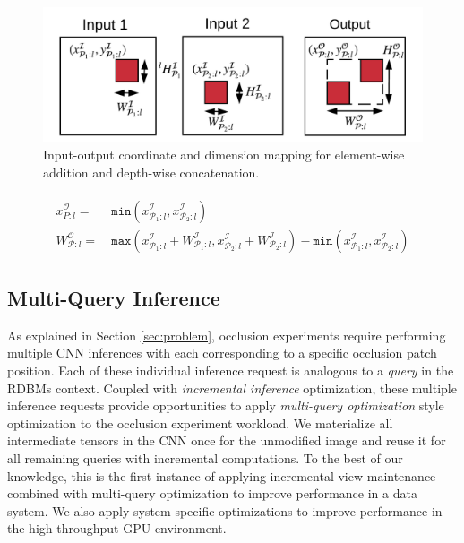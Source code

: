 \begin{figure}[t]
\includegraphics[width=\columnwidth]{images/la_operators}
\caption{Input-output coordinate and dimension mapping for element-wise addition and depth-wise concatenation.}
\label{fig:la_operators}
\end{figure}

\begin{align}
\begin{split}
x^\mathcal{O}_{P:l} =&~ \texttt{min}(x^\mathcal{I}_{\mathcal{P}_1:l}, x^\mathcal{I}_{\mathcal{P}_2:l})\\
W^\mathcal{O}_{\mathcal{P}:l} =&~ \texttt{max}(x^\mathcal{I}_{\mathcal{P}_1:l}+W^\mathcal{I}_{\mathcal{P}_1:l},x^\mathcal{I}_{\mathcal{P}_2:l}+W^\mathcal{I}_{\mathcal{P}_2:l}) -\texttt{min}(x^\mathcal{I}_{\mathcal{P}_1:l},x^\mathcal{I}_{\mathcal{P}_2:l})
\end{split}
\end{align}

\subsection{Multi-Query Inference}
As explained in Section \ref{sec:problem}, occlusion experiments require performing multiple CNN inferences with each corresponding to a specific occlusion patch position.
Each of these individual inference request is analogous to a \textit{query} in the RDBMs context.
Coupled with \textit{incremental inference} optimization, these multiple inference requests provide opportunities to apply \textit{multi-query optimization} style optimization to the occlusion experiment workload.
We materialize all intermediate tensors in the CNN once for the unmodified image and reuse it for all remaining queries with incremental computations.
To the best of our knowledge, this is the first instance of applying incremental view maintenance combined with multi-query optimization to improve performance in a data system.
We also apply system specific optimizations to improve performance in the high throughput GPU environment.

